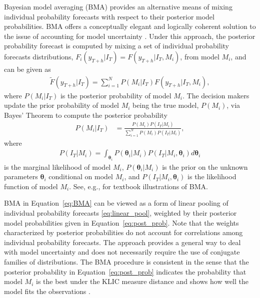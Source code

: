 \documentclass[a4paper,11pt]{article}
\begin{document}
Bayesian model averaging (BMA) provides an alternative means of mixing individual probability forecasts with respect to their posterior model probabilities. BMA offers a conceptually elegant and logically coherent solution to the issue of accounting for model uncertainty \citep[see, e.g.,][]{Leamer1978-sp,Draper1995-cd,Raftery1997-ij,Garratt2003-kh}. Under this approach, the posterior probability forecast is computed by mixing a set of individual probability forecasts distributions, $F_{i}(y_{T+h}|I_{T})=F(y_{T+h}|I_{T},M_{i})$, from model $M_{i}$, and can be given as
\begin{align}
  \label{eq:BMA}
  \tilde{F}(y_{T+h}|I_{T}) = \sum_{i=1}^{N} P(M_{i}|I_{T})F(y_{T+h}|I_{T},M_{i}),
\end{align}
where $P(M_{i}|I_{T})$ is the posterior probability of model $M_{i}$. The decision makers update the prior probability of model $M_{i}$ being the true model, $P(M_{i})$, via Bayes' Theorem to compute the posterior probability
\begin{align}
  \label{eq:post_prob}
  P(M_{i}|I_{T}) & = \frac{P(M_{i})P(I_{T}|M_{i})}{\sum_{i=1}^{N} P(M_{i})P(I_{T}|M_{i})},
\end{align}
where
\begin{align}
  \label{eq:marginal_likelihood}
  P(I_{T}|M_{i}) = \int_{\bm{\theta}_{i}} P\left(\bm{\theta}_{i} | M_{i}\right) P\left(I_{T} | M_{i}, \bm{\theta}_{i}\right) d \bm{\theta}_{i}
\end{align}
is the marginal likelihood of model $M_{i}$, $P\left(\bm{\theta}_{i} | M_{i}\right)$ is the prior on the unknown parameters $\bm{\theta}_{i}$ conditional on model $M_{i}$, and $P\left(I_{T} | M_{i}, \bm{\theta}_{i}\right)$ is the likelihood function of model $M_{i}$. See, e.g., \citet{Koop-2003bayesian} for textbook illustrations of BMA.

BMA in Equation~\eqref{eq:BMA} can be viewed as a form of linear pooling of individual probability forecasts \eqref{eq:linear_pool}, weighted by their posterior model probabilities given in Equation~\eqref{eq:post_prob}. Note that the weights characterized by posterior probabilities do not account for correlations among individual probability forecasts. The approach provides a general way to deal with model uncertainty and does not necessarily require the use of conjugate families of distributions. The BMA procedure is consistent in the sense that the posterior probability in Equation~\eqref{eq:post_prob} indicates the probability that model $M_{i}$ is the best under the KLIC measure distance and shows how well the model fits the observations \citep{Fernandez-Villaverde2004-pz,Raftery2005-vu,Wright2008-bs}.
\end{document}
